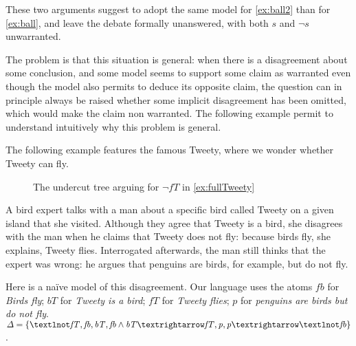 \documentclass[version=3.21, pagesize, twoside=off, bibliography=totoc, DIV=calc, fontsize=12pt, a4paper, french, english]{scrartcl}
\begin{document}
These two arguments suggest to adopt the same model for \cref{ex:ball2} than for \cref{ex:ball}, and leave the debate formally unanswered, with both $\mathit{s}$ and $¬\mathit{s}$ unwarranted.

The problem is that this situation is general: when there is a disagreement about some conclusion, and some model seems to support some claim as warranted even though the model also permits to deduce its opposite claim, the question can in principle always be raised whether some implicit disagreement has been omitted, which would make the claim non warranted. The following example permit to understand intuitively why this problem is general.

The following example features the famous Tweety, where we wonder whether Tweety can fly.
\begin{figure}
	\caption{The undercut tree arguing for $¬\mathit{fT}$ in \cref{ex:fullTweety}}
	\label{fig:tweety}
\end{figure}
\begin{example}
	\label{ex:fullTweety}
	A bird expert talks with a man about a specific bird called Tweety on a given island that she visited. Although they agree that Tweety is a bird, she disagrees with the man when he claims that Tweety does not fly: because birds fly, she explains, Tweety flies. Interrogated afterwards, the man still thinks that the expert was wrong: he argues that penguins are birds, for example, but do not fly.
	
	Here is a naïve model of this disagreement.
	Our language uses the atoms 
	$\mathit{fb}$ for \emph{Birds fly}; 
	$\mathit{bT}$ for \emph{Tweety is a bird}; 
	$\mathit{fT}$ for \emph{Tweety flies}; 
	$\mathit{p}$ for \emph{penguins are birds but do not fly}.
	$\Delta = \set{¬\mathit{fT}, \mathit{fb}, \mathit{bT},\allowbreak \mathit{fb} \land \mathit{bT} → \mathit{fT}, \mathit{p},\allowbreak \mathit{p} → ¬\mathit{fb}}$.
\end{example}
\end{document}
